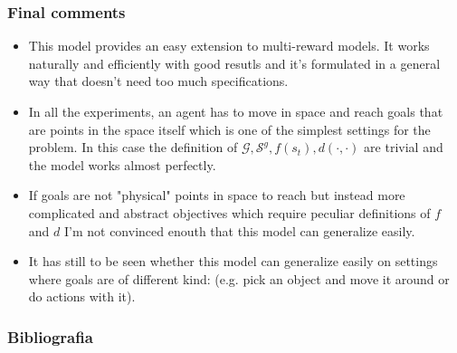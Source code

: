 \documentclass{beamer}
\theoremstyle{plain}
\theoremstyle{definition}
\theoremstyle{remark}
\begin{document}
\begin{frame}
	\frametitle{Final comments}
	\begin{itemize}
		\item This model provides an easy extension to multi-reward models. It works naturally and efficiently with good resutls and it's formulated in a general way that doesn't need too much specifications.
		\item In all the experiments, an agent has to move in space and reach goals that are points in the space itself which is one of the simplest settings for the problem. In this case the definition of $\mathcal{G},\mathcal{S}^g, f(s_t), d(\cdot,\cdot)$ are trivial and the model works almost perfectly.
		\item If goals are not "physical" points in space to reach but instead more complicated and abstract objectives which require peculiar definitions of $f$ and $d$ I'm not convinced enouth that this model can generalize easily.
		\item It has still to be seen whether this model can generalize easily on settings where goals are of different kind: (e.g. pick an object and move it around or do actions with it).
	\end{itemize}
\end{frame}

\nocite{AGG}

\begin{frame}[allowframebreaks]
	\frametitle{Bibliografia}
	
	
\end{frame}



\end{document}
